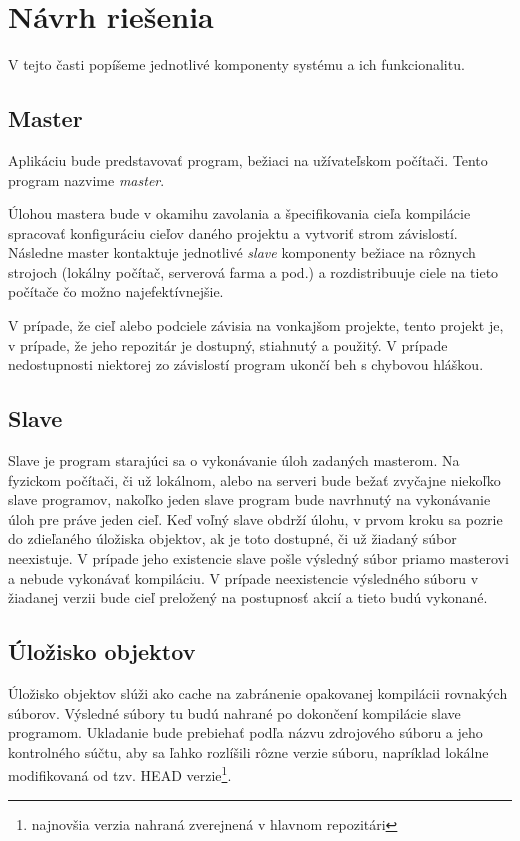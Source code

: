 \section{N\'{a}vrh rie\v{s}enia}
\label{sec:solution}
V tejto časti popíšeme jednotlivé komponenty systému a ich funkcionalitu.

\subsection{Master}
\label{sub:solution:master}
Aplikáciu bude predstavovať program, bežiaci na užívateľskom počítači. Tento program
nazvime {\it master}.

Úlohou mastera bude v okamihu zavolania a špecifikovania cieľa kompilácie spracovať
konfiguráciu cieľov daného projektu a vytvoriť strom závislostí. Následne master
kontaktuje jednotlivé {\it slave} komponenty bežiace na rôznych strojoch (lokálny
počítač, serverová farma a pod.) a rozdistribuuje ciele na tieto počítače čo možno
najefektívnejšie.

V prípade, že cieľ alebo podciele závisia na vonkajšom projekte, tento projekt je,
v prípade, že jeho repozitár je dostupný, stiahnutý a použitý. V prípade nedostupnosti
niektorej zo závislostí program ukončí beh s chybovou hláškou.

\subsection{Slave}
\label{sub:solution:slave}
Slave je program starajúci sa o vykonávanie úloh zadaných masterom. Na fyzickom počítači,
či už lokálnom, alebo na serveri bude bežať zvyčajne niekoľko slave programov, nakoľko
jeden slave program bude navrhnutý na vykonávanie úloh pre práve jeden cieľ. Keď voľný
slave obdrží úlohu, v prvom kroku sa pozrie do zdieľaného úložiska objektov, ak je
toto dostupné, či už žiadaný súbor neexistuje. V prípade jeho existencie slave
pošle výsledný súbor priamo masterovi a nebude vykonávať kompiláciu. V prípade
neexistencie výsledného súboru v žiadanej verzii bude cieľ preložený na postupnosť
akcií a tieto budú vykonané.

\subsection{\'{U}lo\v{z}isko objektov}
\label{sub:solution:storage}
Úložisko objektov slúži ako cache na zabránenie opakovanej kompilácii rovnakých
súborov. Výsledné súbory tu budú nahrané po dokončení kompilácie slave programom.
Ukladanie bude prebiehať podľa názvu zdrojového súboru a jeho kontrolného súčtu,
aby sa ľahko rozlíšili rôzne verzie súboru, napríklad lokálne modifikovaná od
tzv. HEAD verzie\footnote{najnovšia verzia nahraná zverejnená v hlavnom repozitári}.

